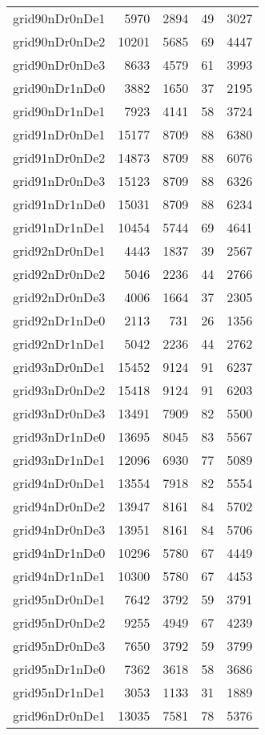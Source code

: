 \begin{longtable}{lrrrr}
grid90nDr0nDe1 & 5970 & 2894 & 49 & 3027 \\
grid90nDr0nDe2 & 10201 & 5685 & 69 & 4447 \\
grid90nDr0nDe3 & 8633 & 4579 & 61 & 3993 \\
grid90nDr1nDe0 & 3882 & 1650 & 37 & 2195 \\
grid90nDr1nDe1 & 7923 & 4141 & 58 & 3724 \\
grid91nDr0nDe1 & 15177 & 8709 & 88 & 6380 \\
grid91nDr0nDe2 & 14873 & 8709 & 88 & 6076 \\
grid91nDr0nDe3 & 15123 & 8709 & 88 & 6326 \\
grid91nDr1nDe0 & 15031 & 8709 & 88 & 6234 \\
grid91nDr1nDe1 & 10454 & 5744 & 69 & 4641 \\
grid92nDr0nDe1 & 4443 & 1837 & 39 & 2567 \\
grid92nDr0nDe2 & 5046 & 2236 & 44 & 2766 \\
grid92nDr0nDe3 & 4006 & 1664 & 37 & 2305 \\
grid92nDr1nDe0 & 2113 & 731 & 26 & 1356 \\
grid92nDr1nDe1 & 5042 & 2236 & 44 & 2762 \\
grid93nDr0nDe1 & 15452 & 9124 & 91 & 6237 \\
grid93nDr0nDe2 & 15418 & 9124 & 91 & 6203 \\
grid93nDr0nDe3 & 13491 & 7909 & 82 & 5500 \\
grid93nDr1nDe0 & 13695 & 8045 & 83 & 5567 \\
grid93nDr1nDe1 & 12096 & 6930 & 77 & 5089 \\
grid94nDr0nDe1 & 13554 & 7918 & 82 & 5554 \\
grid94nDr0nDe2 & 13947 & 8161 & 84 & 5702 \\
grid94nDr0nDe3 & 13951 & 8161 & 84 & 5706 \\
grid94nDr1nDe0 & 10296 & 5780 & 67 & 4449 \\
grid94nDr1nDe1 & 10300 & 5780 & 67 & 4453 \\
grid95nDr0nDe1 & 7642 & 3792 & 59 & 3791 \\
grid95nDr0nDe2 & 9255 & 4949 & 67 & 4239 \\
grid95nDr0nDe3 & 7650 & 3792 & 59 & 3799 \\
grid95nDr1nDe0 & 7362 & 3618 & 58 & 3686 \\
grid95nDr1nDe1 & 3053 & 1133 & 31 & 1889 \\
grid96nDr0nDe1 & 13035 & 7581 & 78 & 5376 \\

\end{longtable}

